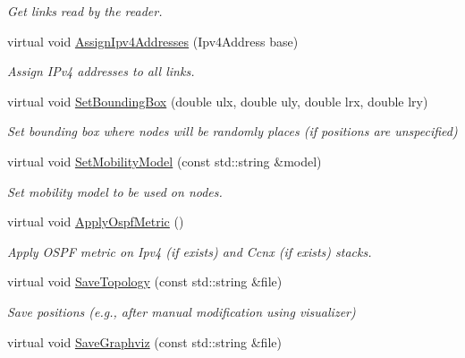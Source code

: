 \begin{DoxyCompactItemize}
\begin{DoxyCompactList}\small\item\em Get links read by the reader. \end{DoxyCompactList}\item 
virtual void \hyperlink{classns3_1_1AnnotatedTopologyReader_a3bdadbc6076b8412a82359d97cb07e84}{Assign\+Ipv4\+Addresses} (Ipv4\+Address base)
\begin{DoxyCompactList}\small\item\em Assign I\+Pv4 addresses to all links. \end{DoxyCompactList}\item 
virtual void \hyperlink{classns3_1_1AnnotatedTopologyReader_abdbf087f331d303447ea5d554c677275}{Set\+Bounding\+Box} (double ulx, double uly, double lrx, double lry)
\begin{DoxyCompactList}\small\item\em Set bounding box where nodes will be randomly places (if positions are unspecified) \end{DoxyCompactList}\item 
virtual void \hyperlink{classns3_1_1AnnotatedTopologyReader_a8ec3fef68f60f440fc795bb232532db6}{Set\+Mobility\+Model} (const std\+::string \&model)
\begin{DoxyCompactList}\small\item\em Set mobility model to be used on nodes. \end{DoxyCompactList}\item 
virtual void \hyperlink{classns3_1_1AnnotatedTopologyReader_a3e0cf2299c8948c03a10999038b96be5}{Apply\+Ospf\+Metric} ()\hypertarget{classns3_1_1AnnotatedTopologyReader_a3e0cf2299c8948c03a10999038b96be5}{}\label{classns3_1_1AnnotatedTopologyReader_a3e0cf2299c8948c03a10999038b96be5}

\begin{DoxyCompactList}\small\item\em Apply O\+S\+PF metric on Ipv4 (if exists) and Ccnx (if exists) stacks. \end{DoxyCompactList}\item 
virtual void \hyperlink{classns3_1_1AnnotatedTopologyReader_a547e910c04eb2a525b3a869d1c521ec3}{Save\+Topology} (const std\+::string \&file)\hypertarget{classns3_1_1AnnotatedTopologyReader_a547e910c04eb2a525b3a869d1c521ec3}{}\label{classns3_1_1AnnotatedTopologyReader_a547e910c04eb2a525b3a869d1c521ec3}

\begin{DoxyCompactList}\small\item\em Save positions (e.\+g., after manual modification using visualizer) \end{DoxyCompactList}\item 
virtual void \hyperlink{classns3_1_1AnnotatedTopologyReader_a2078a690442885c1c3e2ae5fd9c83895}{Save\+Graphviz} (const std\+::string \&file)\hypertarget{classns3_1_1AnnotatedTopologyReader_a2078a690442885c1c3e2ae5fd9c83895}{}\label{classns3_1_1AnnotatedTopologyReader_a2078a690442885c1c3e2ae5fd9c83895}


\end{DoxyCompactItemize}
